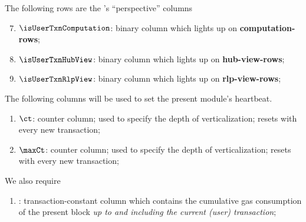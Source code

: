 \noindent The following rows are the \txnDataMod{}'s ``perspective'' columns
\begin{enumerate}\setcounter{enumi}{6}
	\item
		$\isUserTxnComputation$:
		binary column which lights up on \textbf{computation-rows};
	\item
		$\isUserTxnHubView$:
		binary column which lights up on \textbf{hub-view-rows};
	\item
		$\isUserTxnRlpView$:
		binary column which lights up on \textbf{rlp-view-rows};
\end{enumerate}
\noindent The following columns will be used to set the present module's heartbeat.
\begin{enumerate}[resume]
	\item $\ct$:
		counter column;
		used to specify the depth of verticalization;
		resets with every new transaction; 
	\item $\maxCt$:
		counter column;
		used to specify the depth of verticalization;
		resets with every new transaction; 
\end{enumerate}
We also require
\begin{enumerate}[resume]
	\item \cumulativeConsumedGas:
		transaction-constant column which contains the cumulative gas consumption of the present block
		\emph{up to and including the current (user) transaction};
\end{enumerate}
